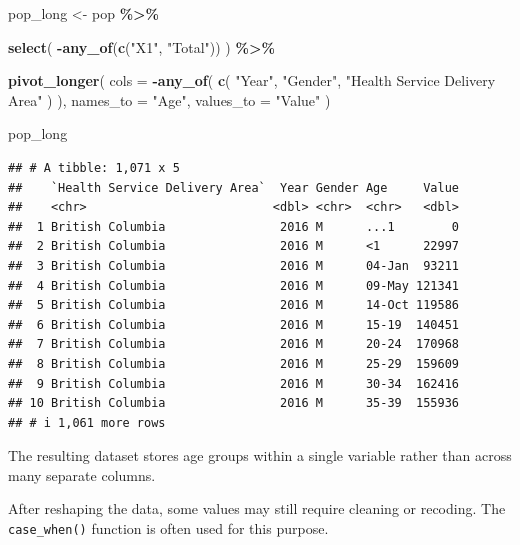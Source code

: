 \documentclass[
  11pt,
  oneside]{book}
\newenvironment{Shaded}{\begin{snugshade}}{\end{snugshade}}
\newcommand{\AttributeTok}[1]{\textcolor[rgb]{0.13,0.29,0.53}{#1}}
\newcommand{\FunctionTok}[1]{\textcolor[rgb]{0.13,0.29,0.53}{\textbf{#1}}}
\newcommand{\NormalTok}[1]{#1}
\newcommand{\OtherTok}[1]{\textcolor[rgb]{0.56,0.35,0.01}{#1}}
\newcommand{\SpecialCharTok}[1]{\textcolor[rgb]{0.81,0.36,0.00}{\textbf{#1}}}
\newcommand{\StringTok}[1]{\textcolor[rgb]{0.31,0.60,0.02}{#1}}
\begin{document}
\begin{Shaded}
\begin{Highlighting}[]
\NormalTok{pop\_long }\OtherTok{\textless{}{-}}\NormalTok{ pop }\SpecialCharTok{\%\textgreater{}\%}
  
  \FunctionTok{select}\NormalTok{(}
    \SpecialCharTok{{-}}\FunctionTok{any\_of}\NormalTok{(}\FunctionTok{c}\NormalTok{(}\StringTok{"X1"}\NormalTok{, }\StringTok{"Total"}\NormalTok{))}
\NormalTok{  ) }\SpecialCharTok{\%\textgreater{}\%}
  
  \FunctionTok{pivot\_longer}\NormalTok{(}
    \AttributeTok{cols =} \SpecialCharTok{{-}}\FunctionTok{any\_of}\NormalTok{(}
      \FunctionTok{c}\NormalTok{(}
        \StringTok{"Year"}\NormalTok{,}
        \StringTok{"Gender"}\NormalTok{,}
        \StringTok{"Health Service Delivery Area"}
\NormalTok{      )}
\NormalTok{    ),}
    \AttributeTok{names\_to =} \StringTok{"Age"}\NormalTok{,}
    \AttributeTok{values\_to =} \StringTok{"Value"}
\NormalTok{  )}

\NormalTok{pop\_long}
\end{Highlighting}
\end{Shaded}

\begin{verbatim}
## # A tibble: 1,071 x 5
##    `Health Service Delivery Area`  Year Gender Age     Value
##    <chr>                          <dbl> <chr>  <chr>   <dbl>
##  1 British Columbia                2016 M      ...1        0
##  2 British Columbia                2016 M      <1      22997
##  3 British Columbia                2016 M      04-Jan  93211
##  4 British Columbia                2016 M      09-May 121341
##  5 British Columbia                2016 M      14-Oct 119586
##  6 British Columbia                2016 M      15-19  140451
##  7 British Columbia                2016 M      20-24  170968
##  8 British Columbia                2016 M      25-29  159609
##  9 British Columbia                2016 M      30-34  162416
## 10 British Columbia                2016 M      35-39  155936
## # i 1,061 more rows
\end{verbatim}

The resulting dataset stores age groups within a single variable rather than across many separate columns.

After reshaping the data, some values may still require cleaning or recoding. The \texttt{case\_when()} function is often used for this purpose.
\end{document}
